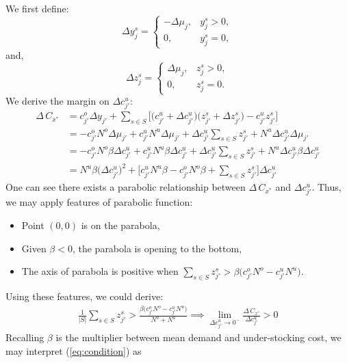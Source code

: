 \documentclass[a4paper,11pt]{article}
\begin{document}
We first define:
\[
    \Delta y_j^s =
    \begin{cases}
        -\Delta \mu_j, & y_j^s > 0,\\
        0, & y_j^s = 0,
    \end{cases}
\]
and,
\[
    \Delta z_j^s =
    \begin{cases}
        \Delta \mu_j, & z_j^s > 0,\\
        0, & z_j^s = 0.
    \end{cases}
\]
We derive the margin on $\Delta c_{j'}^u$:
\[
\begin{aligned}
    \Delta \, C_{x^*}
    & = c_{j'}^o \Delta y_{j'} + \sum_{s \in S} \big[ \big( c_{j'}^u + \Delta c_{j'}^u \big) \big( z_{j'}^s + \Delta z_{j'}^s \big) - c_{j'}^u z_{j'}^s \big]\\
    & = -c_{j'}^o N^o \Delta \mu_{j'} + c_{j'}^u 
    N^u \Delta \mu_{j'} + \Delta c_{j'}^u \sum_{s \in S} z_{j'}^s + N^u \Delta c_{j'}^u \Delta \mu_{j'}\\
    & = -c_{j'}^o N^o \beta \Delta c_{j'}^u + c_{j'}^u N^u \beta \Delta c_{j'}^u + \Delta c_{j'}^u \sum_{s \in S} z_{j'}^s + N^u \Delta c_{j'}^u \beta \Delta c_{j'}^u\\
    & = N^u \beta \big( \Delta c_{j'}^u \big)^2 + \big[ c_{j'}^u N^u \beta - c_{j'}^o N^o \beta + \sum_{s \in S} z_{j'}^s \big] \Delta c_{j'}^u
\end{aligned}
\]
One can see there exists a parabolic relationship between $\Delta \, C_{x^*}$ and $\Delta c_{j'}^u$. Thus, we may apply features of parabolic function:
\begin{itemize}
    \item Point $(0,0)$ is on the parabola,
    \item Given $\beta < 0$, the parabola is opening to the bottom,
    \item The axis of parabola is positive when $\sum_{s \in S} z_{j'}^s > \beta \big( c_{j'}^o N^o - c_{j'}^u N^u \big)$.
\end{itemize}
Using these features, we could derive:
\begin{eqnarray}
\label{eq:condition}
    \frac{1}{|S|} \sum_{s \in S} z_{j'}^s > \frac{\beta \big( c_{j'}^o N^o - c_{j'}^u N^u \big)}{N^o + N^u} \implies \lim_{\Delta c_{j'}^u \to 0^-} \frac{\Delta \, C_{x^*}}{\Delta c_{j'}^u} > 0
\end{eqnarray}
Recalling $\beta$ is the multiplier between mean demand and under-stocking cost, we may interpret (\ref{eq:condition}) as 
\end{document}
